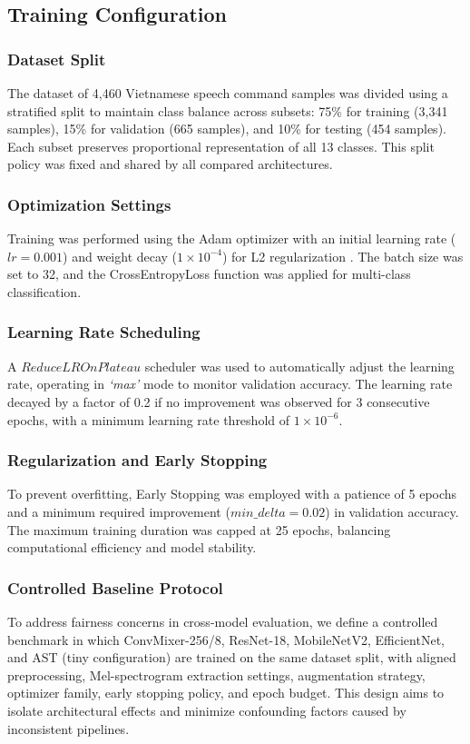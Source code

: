 \subsection*{Training Configuration}

\subsubsection*{Dataset Split}
The dataset of 4,460 Vietnamese speech command samples was divided using a stratified split to maintain class balance across subsets: 75\% for training (3,341 samples), 15\% for validation (665 samples), and 10\% for testing (454 samples). Each subset preserves proportional representation of all 13 classes. This split policy was fixed and shared by all compared architectures.

\subsubsection*{Optimization Settings}
Training was performed using the Adam optimizer with an initial learning rate ($lr = 0.001$) and weight decay ($1 \times 10^{-4}$) for L2 regularization \cite{Loshchilov2018AdamW}. The batch size was set to 32, and the CrossEntropyLoss function was applied for multi-class classification.

\subsubsection*{Learning Rate Scheduling}
A $ReduceLROnPlateau$ scheduler was used to automatically adjust the learning rate, operating in \textit{‘max’} mode to monitor validation accuracy. The learning rate decayed by a factor of 0.2 if no improvement was observed for 3 consecutive epochs, with a minimum learning rate threshold of $1 \times 10^{-6}$.

\subsubsection*{Regularization and Early Stopping}
To prevent overfitting, Early Stopping was employed with a patience of 5 epochs and a minimum required improvement ($min\_delta = 0.02$) in validation accuracy. The maximum training duration was capped at 25 epochs, balancing computational efficiency and model stability.

\subsubsection*{Controlled Baseline Protocol}
To address fairness concerns in cross-model evaluation, we define a controlled benchmark in which ConvMixer-256/8, ResNet-18, MobileNetV2, EfficientNet, and AST (tiny configuration) are trained on the same dataset split, with aligned preprocessing, Mel-spectrogram extraction settings, augmentation strategy, optimizer family, early stopping policy, and epoch budget. This design aims to isolate architectural effects and minimize confounding factors caused by inconsistent pipelines.

